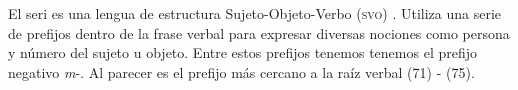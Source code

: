 El seri es una lengua de estructura Sujeto-Objeto-Verbo (\textsc{svo}) \textcolor{MidnightBlue}{\citep{Seri}}. Utiliza una serie de prefijos dentro de la frase verbal para expresar diversas nociones como persona y número del sujeto u objeto. Entre estos prefijos tenemos tenemos el prefijo negativo {\setmainfont{Charis SIL} \textit{m}-}. Al parecer es el prefijo más cercano a la raíz verbal (71) - (75).